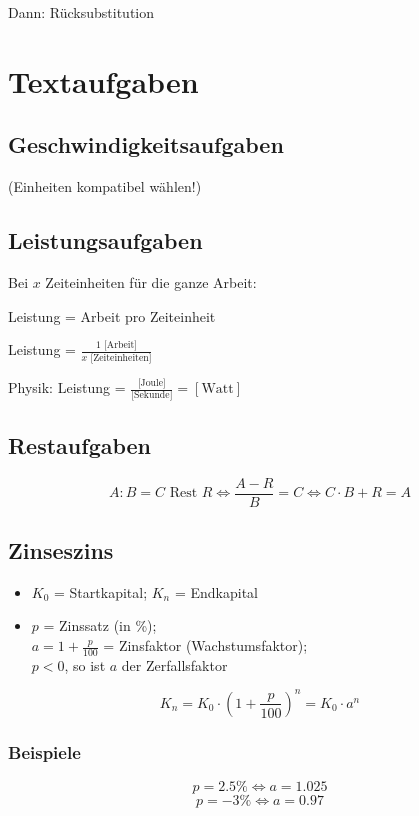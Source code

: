 \begin{multicols}{2}
Dann: Rücksubstitution


\hrulefill
\section*{Textaufgaben}
\subsection*{Geschwindigkeitsaufgaben}
 (Einheiten kompatibel wählen!)

\subsection*{Leistungsaufgaben}
Bei $x$ Zeiteinheiten für die ganze Arbeit:

Leistung = Arbeit pro Zeiteinheit

Leistung = $\frac{1 \textrm{ [Arbeit]}}{x \textrm{ [Zeiteinheiten]}}$

Physik: Leistung = $\frac{\textrm{[Joule]}}{\textrm{[Sekunde]}} = [\textrm{Watt}]$

\subsection*{Restaufgaben}
$$A:B = C \textrm{ Rest } R \Longleftrightarrow{} \frac{A-R}B=C \Longleftrightarrow{}  C\cdot{}B+R = A $$


\subsection*{Zinseszins}
\begin{itemize}
\item $K_0$ = Startkapital; $K_n$ = Endkapital
\item $p$ = Zinssatz (in \%);\\ $a = 1+\frac{p}{100}$ = Zinsfaktor
(Wachstumsfaktor);\\ $p<0$, so ist $a$ der Zerfallsfaktor
\end{itemize}
$$K_n = K_0 \cdot{} \left( 1+\frac{p}{100} \right)^n = K_0\cdot{}a^n$$

\subsubsection*{Beispiele}
$$p = 2.5\% \Longleftrightarrow{} a = 1.025$$
$$p = -3\% \Longleftrightarrow{}  a = 0.97 $$


\end{multicols}
